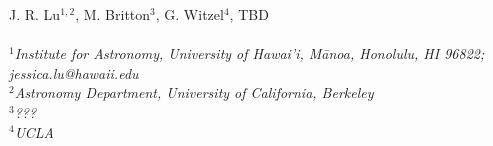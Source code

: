 J. R. Lu${}^{1,2}$,
M. Britton${}^3$,
G. Witzel${}^4$,
TBD
\\
\\
${}^1${\em Institute for Astronomy, University of Hawai'i, M\={a}noa,
    Honolulu, HI 96822; jessica.lu@hawaii.edu}
\\
${}^2${\em Astronomy Department, University of California, Berkeley}
\\
${}^3${\em ???}
\\
${}^4${\em UCLA}
\\
